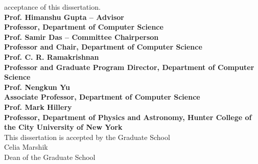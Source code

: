 \begin{center}
    \vspace{0.25cm}
    acceptance of this dissertation.  \\
    \vspace{1.0cm}
    \textbf{Prof. Himanshu Gupta -- Advisor} \\
    \textbf{Professor, Department of Computer Science}   \\
    \vspace{0.75cm}
    \textbf{Prof. Samir Das  -- Committee Chairperson} \\
    \textbf{Professor and Chair, Department of Computer Science}  \\
    \vspace{0.75cm}
    \textbf{Prof. C. R. Ramakrishnan}\\
    \textbf{Professor and Graduate Program Director, Department of Computer Science}   \\
    \vspace{0.75cm}
    \textbf{Prof. Nengkun Yu} \\
    \textbf{Associate Professor, Department of Computer Science} \\
    \vspace{0.75cm}
    \textbf{Prof. Mark Hillery} \\
    \textbf{Professor, Department of Physics and Astronomy, Hunter College of the City University of New York} \\
    \vspace{1cm}
    This dissertation is accepted by the Graduate School  \\
    \vspace{0.75cm}
    Celia Marshik  \\
    Dean of the Graduate School  \\
    \vspace{0.5cm}
    \eject 

  \end{center}
  